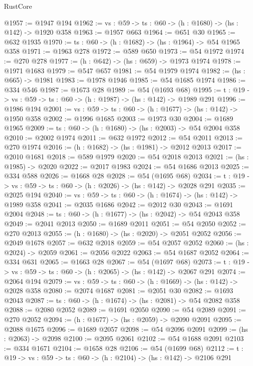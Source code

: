 \begin{lexlean}{RustCore}
\begin{coremodule}
@1957 := @1947 @194
@1962 := {vs : @59} -> {ts : @60} -> (h : @1680) -> (hs : @142) -> @1920 @358
@1963 := @1957 @663
@1964 := @651 @30
@1965 := @632 @1935
@1970 := {ts : @60} -> (h : @1682) -> (hs : @1964) -> @54 @1965 @358
@1971 := @1963 @278
@1972 := @589 @650
@1973 := @54 @1972
@1974 := @270 @278
@1977 := (h : @642) -> (hs : @659) -> @1973 @1974
@1978 := @1971 @1683
@1979 := @547 @657
@1981 := @54 @1979 @1974
@1982 := (hs : @665) -> @1981
@1983 := @1978 @1946
@1985 := @54 @1685 @1974
@1986 := @334 @546
@1987 := @1673 @28
@1989 := @54 (@1693 @68)
@1995 := {t : @19} -> {vs : @59} -> {ts : @60} -> (h : @1987) -> (hs : @142) -> @1989 @291
@1996 := @1986 @194
@2001 := {vs : @59} -> {ts : @60} -> (h : @1677) -> (hs : @142) -> @1950 @358
@2002 := @1996 @1685
@2003 := @1973 @30
@2004 := @1689 @1965
@2009 := {ts : @60} -> (h : @1680) -> (hs : @2003) -> @54 @2004 @358
@2010 := @2002 @1974
@2011 := @632 @1972
@2012 := @54 @2011
@2013 := @270 @1974
@2016 := (h : @1682) -> (hs : @1981) -> @2012 @2013
@2017 := @2010 @1681
@2018 := @589 @1979
@2020 := @54 @2018 @2013
@2021 := (hs : @1985) -> @2020
@2022 := @2017 @1983
@2024 := @54 @1686 @2013
@2025 := @334 @588
@2026 := @1668 @28
@2028 := @54 (@1695 @68)
@2034 := {t : @19} -> {vs : @59} -> {ts : @60} -> (h : @2026) -> (hs : @142) -> @2028 @291
@2035 := @2025 @194
@2040 := {vs : @59} -> {ts : @60} -> (h : @1674) -> (hs : @142) -> @1989 @358
@2041 := @2035 @1686
@2042 := @2012 @30
@2043 := @1691 @2004
@2048 := {ts : @60} -> (h : @1677) -> (hs : @2042) -> @54 @2043 @358
@2049 := @2041 @2013
@2050 := @1689 @2011
@2051 := @54 @2050
@2052 := @270 @2013
@2055 := (h : @1680) -> (hs : @2020) -> @2051 @2052
@2056 := @2049 @1678
@2057 := @632 @2018
@2059 := @54 @2057 @2052
@2060 := (hs : @2024) -> @2059
@2061 := @2056 @2022
@2063 := @54 @1687 @2052
@2064 := @334 @631
@2065 := @1663 @28
@2067 := @54 (@1697 @68)
@2073 := {t : @19} -> {vs : @59} -> {ts : @60} -> (h : @2065) -> (hs : @142) -> @2067 @291
@2074 := @2064 @194
@2079 := {vs : @59} -> {ts : @60} -> (h : @1669) -> (hs : @142) -> @2028 @358
@2080 := @2074 @1687
@2081 := @2051 @30
@2082 := @1693 @2043
@2087 := {ts : @60} -> (h : @1674) -> (hs : @2081) -> @54 @2082 @358
@2088 := @2080 @2052
@2089 := @1691 @2050
@2090 := @54 @2089
@2091 := @270 @2052
@2094 := (h : @1677) -> (hs : @2059) -> @2090 @2091
@2095 := @2088 @1675
@2096 := @1689 @2057
@2098 := @54 @2096 @2091
@2099 := (hs : @2063) -> @2098
@2100 := @2095 @2061
@2102 := @54 @1688 @2091
@2103 := @334 @1671
@2104 := @1658 @28
@2106 := @54 (@1699 @68)
@2112 := {t : @19} -> {vs : @59} -> {ts : @60} -> (h : @2104) -> (hs : @142) -> @2106 @291

\end{coremodule}
\end{lexlean}

